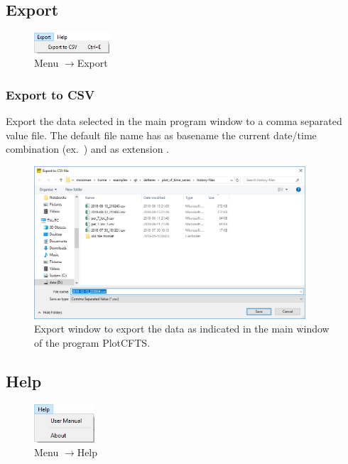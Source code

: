 \documentclass{deltares_memo}
\newcommand{\menuarrow}{$\rightarrow$}
\newcommand{\plotcfts}{PlotCFTS\xspace}
\begin{document}
\subsection{Export}
\begin{figure}[H]
    \centering    
    \includegraphics[width=0.25\textwidth]{pictures/menu_export.png}
    \caption{Menu \menuarrow Export}
\end{figure}
\subsubsection{Export to CSV}
Export the data selected in the main program window to a comma separated value file. 
The default file name has as basename the current date/time combination  (ex.\ ) and as extension .
\begin{figure}[H]
    \centering    
    \includegraphics[width=0.9\textwidth]{pictures/menu_export_csv.png}
    \caption{Export window to export the data as indicated in the main window of the program \plotcfts.}
\end{figure}


\subsection{Help}
\begin{figure}[H]
    \centering    
    \includegraphics[width=0.2\textwidth]{pictures/menu_help.png}
    \caption{Menu \menuarrow Help}
\end{figure}
\end{document}

